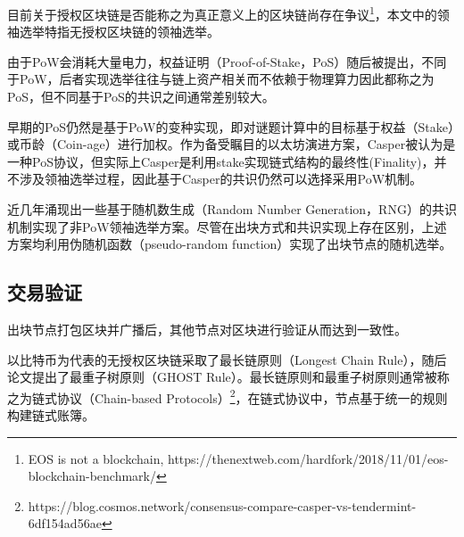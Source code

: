 目前关于授权区块链是否能称之为真正意义上的区块链尚存在争议\footnote{EOS is not a blockchain, https://thenextweb.com/hardfork/2018/11/01/eos-blockchain-benchmark/}，本文中的领袖选举特指无授权区块链的领袖选举。

由于PoW会消耗大量电力，权益证明（Proof-of-Stake，PoS）随后被提出，不同于PoW，后者实现选举往往与链上资产相关而不依赖于物理算力因此都称之为PoS，但不同基于PoS的共识之间通常差别较大。

早期的PoS仍然是基于PoW的变种实现\cite{king2012ppcoin}，即对谜题计算中的目标基于权益（Stake）或币龄（Coin-age）进行加权。作为备受瞩目的以太坊演进方案，Casper\cite{buterin2017casper}被认为是一种PoS协议，但实际上Casper是利用stake实现链式结构的最终性(Finality)，并不涉及领袖选举过程，因此基于Casper的共识仍然可以选择采用PoW机制。


近几年涌现出一些基于随机数生成（Random Number Generation，RNG）的共识机制实现了非PoW领袖选举方案\cite{gilad2017algorand,david2018ouroboros,hanke2018difinity}。尽管在出块方式和共识实现上存在区别，上述方案均利用伪随机函数（pseudo-random function）实现了出块节点的随机选举。


\subsection{交易验证}
\label{subsec:intro_tx_verification}
出块节点打包区块并广播后，其他节点对区块进行验证从而达到一致性。

以比特币为代表的无授权区块链采取了最长链原则（Longest Chain Rule）\cite{nakamoto2008bitcoin}，随后论文\cite{sompolinsky2015secure}提出了最重子树原则（GHOST Rule）。最长链原则和最重子树原则通常被称之为链式协议（Chain-based Protocols）\footnote{https://blog.cosmos.network/consensus-compare-casper-vs-tendermint-6df154ad56ae}，在链式协议中，节点基于统一的规则构建链式账簿。

